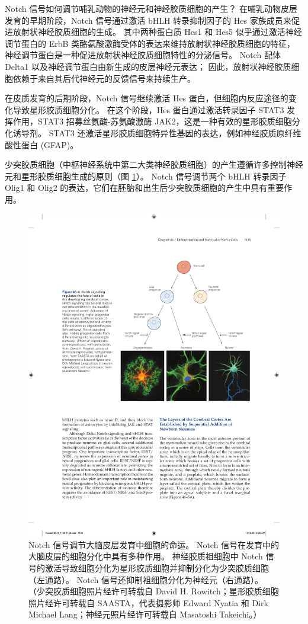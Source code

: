 Notch 信号如何调节哺乳动物的神经元和神经胶质细胞的产生？ 在哺乳动物皮层发育的早期阶段，Notch 信号通过激活 bHLH 转录抑制因子的 Hes 家族成员来促进放射状神经胶质细胞的生成。 其中两种蛋白质 Hes1 和 Hes5 似乎通过激活神经调节蛋白的 ErbB 类酪氨酸激酶受体的表达来维持放射状神经胶质细胞的特征，神经调节蛋白是一种促进放射状神经胶质细胞特性的分泌信号。 Notch 配体 Delta1 以及神经调节蛋白由新生成的皮层神经元表达； 因此，放射状神经胶质细胞依赖于来自其后代神经元的反馈信号来持续生产。

在皮质发育的后期阶段，Notch 信号继续激活 Hes 蛋白，但细胞内反应途径的变化导致星形胶质细胞分化。 在这个阶段，Hes 蛋白通过激活转录因子 STAT3 发挥作用，STAT3 招募丝氨酸-苏氨酸激酶 JAK2，这是一种有效的星形胶质细胞分化诱导剂。 STAT3 还激活星形胶质细胞特异性基因的表达，例如神经胶质原纤维酸性蛋白 (GFAP)。

少突胶质细胞（中枢神经系统中第二大类神经胶质细胞）的产生遵循许多控制神经元和星形胶质细胞生成的原则（图 \ref{fig:46_4}）。 Notch 信号调节两个 bHLH 转录因子 Olig1 和 Olig2 的表达，它们在胚胎和出生后少突胶质细胞的产生中具有重要作用。

\begin{figure}[htbp]
	\centering
	\includegraphics[width=0.7\linewidth]{chap46/fig_46_4}
	\caption{Notch 信号调节大脑皮层发育中细胞的命运。 Notch 信号在发育中的大脑皮层的细胞分化中具有多种作用。 神经胶质祖细胞中 Notch 信号的激活导致细胞分化为星形胶质细胞并抑制分化为少突胶质细胞（左通路）。 Notch 信号还抑制祖细胞分化为神经元（右通路）。 （少突胶质细胞照片经许可转载自 David H. Rowitch；星形胶质细胞照片经许可转载自 SAASTA，代表摄影师 Edward Nyatia 和 Dirk Michael Lang；神经元照片经许可转载自 Masatoshi Takeichi。）}
	\label{fig:46_4}
\end{figure}

